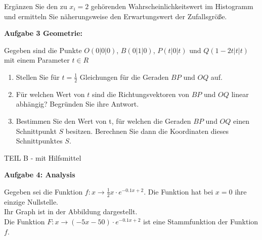 \documentclass[a4paper,12pt]{article}
\newcommand{\Aufgabe}[1]{
  {
  \vspace*{0.5cm}
  \textsf{\textbf{Aufgabe #1}}
  \vspace*{0.2cm}
  
  }
}
\begin{document}

Ergänzen Sie den zu $x_i=2$ gehörenden Wahrscheinlichkeitswert im Histogramm und ermitteln Sie näherungsweise den Erwartungswert der Zufallsgröße.

\Aufgabe{3 Geometrie:}

 Gegeben sind die Punkte  $ O(0 | 0 |0)$, $ B(0 | 1 |0)$, $ P(t | 0 |t)$ und $ Q(1-2t | t |t)$ mit einem  Parameter $t \in R$

\begin{enumerate}[label={\alph*)}] 
\item Stellen Sie für $t=\frac{1}{2}$ Gleichungen für die Geraden $BP$ und $OQ$ auf.
\item Für welchen Wert von $ t$ sind die Richtungsvektoren von $BP$ und $OQ$ linear abhängig? Begründen Sie ihre Antwort.
\item Bestimmen Sie den  Wert von t, für welchen die  Geraden $BP$ und $OQ$ einen Schnittpunkt $S$ besitzen. Berechnen Sie dann die Koordinaten dieses Schnittpunktes $S$.
\end{enumerate}



\newpage
\enlargethispage{2cm}
{TEIL B} - mit Hilfsmittel


\Aufgabe{4: Analysis}
Gegeben sei die Funktion $f: x\rightarrow \frac{1}{2}x\cdot e^{-0.1x+2}$. Die Funktion hat bei $x=0$ ihre einzige Nullstelle.\\
Ihr Graph ist in der Abbildung dargestellt.\\
Die Funktion $F:x\rightarrow (-5x-50)\cdot e^{-0.1x+2}$ ist eine Stammfunktion der Funktion $f$.
\end{document}
